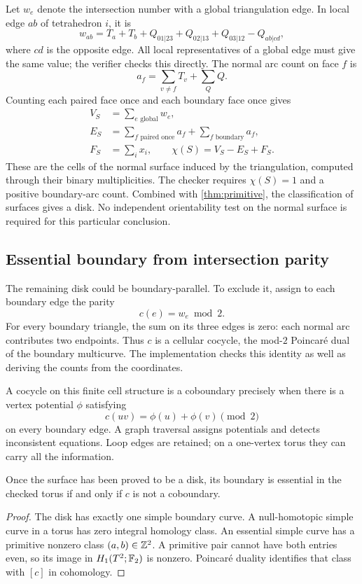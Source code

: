 Let $w_e$ denote the intersection number with a global triangulation edge.
In local edge $ab$ of tetrahedron $i$, it is
\[
 w_{ab}=T_a+T_b+Q_{01|23}+Q_{02|13}+Q_{03|12}-Q_{ab|cd},
\]
where $cd$ is the opposite edge. All local representatives of a global
edge must give the same value; the verifier checks this directly.
The normal arc count on face $f$ is
\[
 a_f=\sum_{v\ne f}T_v+\sum_Q Q.
\]
Counting each paired face once and each boundary face once gives
\begin{align*}
 V_S&=\sum_{e\text{ global}}w_e,\\
 E_S&=\sum_{f\text{ paired once}}a_f+
       \sum_{f\text{ boundary}}a_f,\\
 F_S&=\sum_i x_i,\qquad \chi(S)=V_S-E_S+F_S.
\end{align*}
These are the cells of the normal surface induced by the triangulation,
computed through their binary multiplicities. The checker requires
$\chi(S)=1$ and a positive boundary-arc count. Combined with
\cref{thm:primitive}, the classification of surfaces gives a disk. No
independent orientability test on the normal surface is required for this
particular conclusion.

\subsection{Essential boundary from intersection parity}

The remaining disk could be boundary-parallel. To exclude it, assign to
each boundary edge the parity
\[
 c(e)=w_e\bmod2.
\]
For every boundary triangle, the sum on its three edges is zero: each
normal arc contributes two endpoints. Thus $c$ is a cellular cocycle,
the mod-$2$ Poincar\'e dual of the boundary multicurve. The implementation
checks this identity as well as deriving the counts from the coordinates.

A cocycle on this finite cell structure is a coboundary precisely when
there is a vertex potential $\phi$ satisfying
\[
 c(uv)=\phi(u)+\phi(v)\pmod2
 \label{eq:potential}
\]
on every boundary edge. A graph traversal assigns potentials and detects
inconsistent equations. Loop edges are retained; on a one-vertex torus
they can carry all the information.

\begin{lemma}
\label{lem:boundary-parity}
Once the surface has been proved to be a disk, its boundary is essential
in the checked torus if and only if $c$ is not a coboundary.
\end{lemma}
\begin{proof}
The disk has exactly one simple boundary curve. A null-homotopic simple
curve in a torus has zero integral homology class. An essential simple
curve has a primitive nonzero class $(a,b)\in\mathbb Z^2$. A primitive pair
cannot have both entries even, so its image in $H_1(T^2;\mathbb F_2)$ is nonzero.
Poincar\'e duality identifies that class with $[c]$ in cohomology.
\end{proof}

